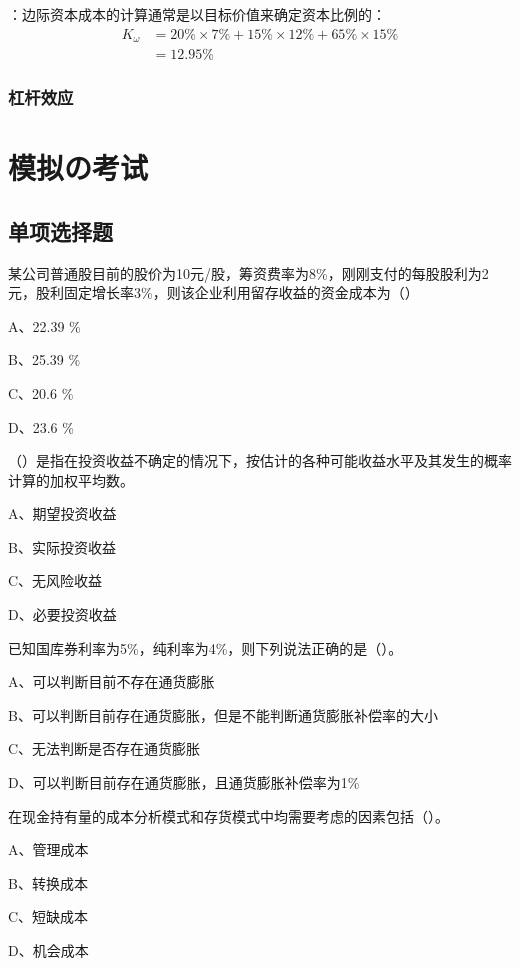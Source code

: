 \documentclass[
  10pt,
  twoside,
  openany,
  b5paper, %
  colorscheme = black, %
  xits = false,
]{qyxf-book}
\begin{document}
\solve[答]：边际资本成本的计算通常是以目标价值来确定资本比例的：
\begin{equation*}
	\begin{aligned}
		K_\omega &= 20\% \times 7\% + 15\% \times 12\% + 65\% \times 15\% \\
		&=12.95\%
	\end{aligned}
	
\end{equation*}

\subsection{杠杆效应}

\chapter{模拟の考试}
\section{单项选择题}
 某公司普通股目前的股价为10元/股，筹资费率为8\%，刚刚支付的每股股利为2元，股利固定增长率3\%，则该企业利用留存收益的资金成本为（\qquad）

A、22.39 \%

B、25.39 \%

C、20.6 \%

D、23.6 \%

 （\qquad）是指在投资收益不确定的情况下，按估计的各种可能收益水平及其发生的概率计算的加权平均数。

A、期望投资收益

B、实际投资收益

C、无风险收益

D、必要投资收益

 已知国库券利率为5\%，纯利率为4\%，则下列说法正确的是（\qquad）。

A、可以判断目前不存在通货膨胀

B、可以判断目前存在通货膨胀，但是不能判断通货膨胀补偿率的大小

C、无法判断是否存在通货膨胀

D、可以判断目前存在通货膨胀，且通货膨胀补偿率为1\%

 在现金持有量的成本分析模式和存货模式中均需要考虑的因素包括（\qquad）。

A、管理成本

B、转换成本

C、短缺成本

D、机会成本
\end{document}
